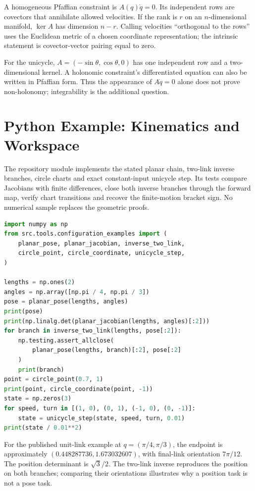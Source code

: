 A homogeneous Pfaffian constraint is $A(q)\dot q=0$. Its independent rows are covectors that annihilate allowed velocities. If the rank is $r$ on an $n$-dimensional manifold, $\ker A$ has dimension $n-r$. Calling velocities ``orthogonal to the rows'' uses the Euclidean metric of a chosen coordinate representation; the intrinsic statement is covector-vector pairing equal to zero.

For the unicycle, $A=(-\sin\theta,\cos\theta,0)$ has one independent row and a two-dimensional kernel. A holonomic constraint's differentiated equation can also be written in Pfaffian form. Thus the appearance of $A\dot q=0$ alone does not prove non-holonomy; integrability is the additional question.

\section{Python Example: Kinematics and Workspace}
\label{sec:python_example}
\label{ex:ex_python_2r}

The repository module implements the stated planar chain, two-link inverse branches, circle charts and exact constant-input unicycle step. Its tests compare Jacobians with finite differences, close both inverse branches through the forward map, verify chart transitions and recover the finite-motion bracket sign. No numerical sample replaces the geometric proofs.

\begin{lstlisting}[language=Python,basicstyle=\ttfamily\small]
import numpy as np
from src.tools.configuration_examples import (
    planar_pose, planar_jacobian, inverse_two_link,
    circle_point, circle_coordinate, unicycle_step,
)

lengths = np.ones(2)
angles = np.array([np.pi / 4, np.pi / 3])
pose = planar_pose(lengths, angles)
print(pose)
print(np.linalg.det(planar_jacobian(lengths, angles)[:2]))
for branch in inverse_two_link(lengths, pose[:2]):
    np.testing.assert_allclose(
        planar_pose(lengths, branch)[:2], pose[:2]
    )
    print(branch)
point = circle_point(0.7, 1)
print(point, circle_coordinate(point, -1))
state = np.zeros(3)
for speed, turn in [(1, 0), (0, 1), (-1, 0), (0, -1)]:
    state = unicycle_step(state, speed, turn, 0.01)
print(state / 0.01**2)
\end{lstlisting}

For the published unit-link example at $q=(\pi/4,\pi/3)$, the endpoint is approximately $(0.448287736,1.673032607)$, with final-link orientation $7\pi/12$. The position determinant is $\sqrt3/2$. The two-link inverse reproduces the position on both branches; comparing their orientations illustrates why a position task is not a pose task.

